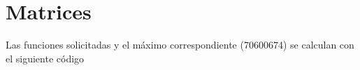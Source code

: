\section{Matrices}

Las funciones solicitadas y el máximo correspondiente (70600674) se calculan con el siguiente código


